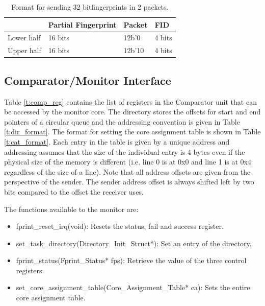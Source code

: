 \begin{table}[h]
\centering
   \begin{tabular}{| l | l | l | l | }
    \hline
     & Partial Fingerprint & Packet & FID\\ \hline
    Lower half & 16 bits & 12b'0 & 4 bits\\ \hline
    Upper half & 16 bits & 12b'10 & 4 bits\\ \hline
    \end{tabular}
    \caption{Format for sending 32 bitfingerprints in 2 packets.}
    \label{t:fprint_format}
\end{table}


\subsection{Comparator/Monitor Interface}

Table \ref{t:comp_reg} contains the list of registers in the Comparator unit that can be accessed by the monitor core. The directory stores the offsets for start and end pointers of a circular queue and the addressing convention is given in Table \ref{t:dir_format}. The format for setting the core assignment table is shown in Table \ref{t:cat_format}. Each entry in the table is given by a unique address and addressing assumes that the size of the individual entry is 4 bytes even if the physical size of the memory is different (i.e. line 0 is at 0x0 and line 1 is at 0x4 regardless of the size of a line). Note that all address offsets are given from the perspective of the sender. The sender address offset is always shifted left by two bits compared to the offset the receiver uses.

The functions available to the monitor are:
\begin{itemize}
\item{fprint\_reset\_irq(void): Resets the status, fail and success register.} 
\item{set\_task\_directory(Directory\_Init\_Struct*): Set an entry of the directory.}
\item{fprint\_status(Fprint\_Status* fps): Retrieve the value of the three control registers.}
\item{set\_core\_assignment\_table(Core\_Assignment\_Table* ca): Sets the entire core assignment table.} 
\end{itemize}

